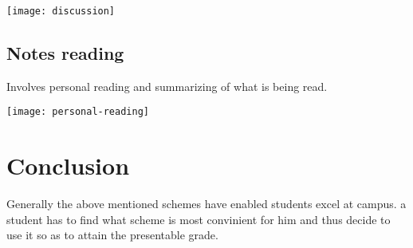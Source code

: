 \documentclass{article}
\begin{document}
\graphicspath{ {methods/} }

\texttt{[image: discussion]}

\subsection{Notes reading}
Involves personal reading and summarizing of what is being read.

\graphicspath{ {methods/} }

\texttt{[image: personal-reading]}


\section{Conclusion}
Generally the above mentioned schemes have enabled students excel at campus. a student has to find what scheme is most convinient for him and thus decide to use it so as to attain the presentable grade.
\end{document}
